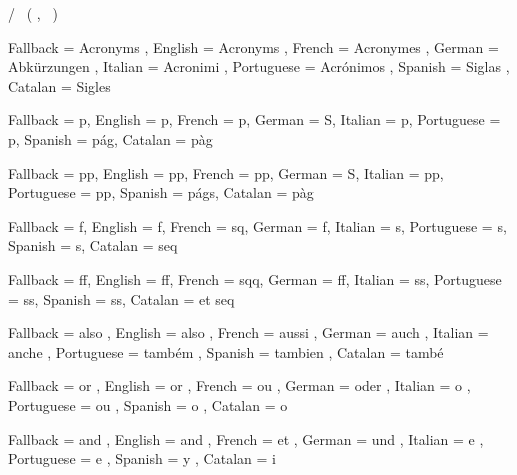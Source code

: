   {
    \acroheading
    \acropreamble
    \acronopagerange
    \acronymsmapF
      {
          {   { / }  }
          {}{}
          {
             {~(}
             {,~}
             {)}
          }
          { \acropages {} {} }
          {}
      }
      { \AcroRerun }
  }

  {
    Fallback   = Acronyms ,
    English    = Acronyms ,
    French     = Acronymes ,
    German     = Abk\"urzungen ,
    Italian    = Acronimi ,
    Portuguese = Acr\'onimos ,
    Spanish    = Siglas ,
    Catalan    = Sigles
  }

  {
    Fallback   = p\abbrdot ,
    English    = p\abbrdot ,
    French     = p\abbrdot ,
    German     = S\abbrdot ,
    Italian    = p\abbrdot ,
    Portuguese = p\abbrdot ,
    Spanish    = p\'ag\abbrdot ,
    Catalan    = p\`ag\abbrdot
  }

  {
    Fallback   = pp\abbrdot ,
    English    = pp\abbrdot ,
    French     = pp\abbrdot ,
    German     = S\abbrdot ,
    Italian    = pp\abbrdot ,
    Portuguese = pp\abbrdot ,
    Spanish    = p\'ags\abbrdot ,
    Catalan    = p\`ag\abbrdot
  }

  {
    Fallback   = f\abbrdot ,
    English    = f\abbrdot ,
    French     = sq\abbrdot ,
    German     = f\abbrdot ,
    Italian    = s\abbrdot ,
    Portuguese = s\abbrdot ,
    Spanish    = s\abbrdot ,
    Catalan    = seq\abbrdot
  }

  {
    Fallback   = ff\abbrdot ,
    English    = ff\abbrdot ,
    French     = sqq\abbrdot ,
    German     = ff\abbrdot ,
    Italian    = ss\abbrdot ,
    Portuguese = ss\abbrdot ,
    Spanish    = ss\abbrdot ,
    Catalan    = et seq\abbrdot
  }

  {
    Fallback   = also ,
    English    = also ,
    French     = aussi ,
    German     = auch ,
    Italian    = anche ,
    Portuguese = tamb\'{e}m ,
    Spanish    = tambien ,
    Catalan    = tamb\'{e}
  }

  {
    Fallback   = or ,
    English    = or ,
    French     = ou ,
    German     = oder ,
    Italian    = o ,
    Portuguese = ou ,
    Spanish    = o ,
    Catalan    = o
  }

  {
    Fallback   = and ,
    English    = and ,
    French     = et ,
    German     = und ,
    Italian    = e ,
    Portuguese = e ,
    Spanish    = y ,
    Catalan    = i
  }

\AcroModuleEnd
